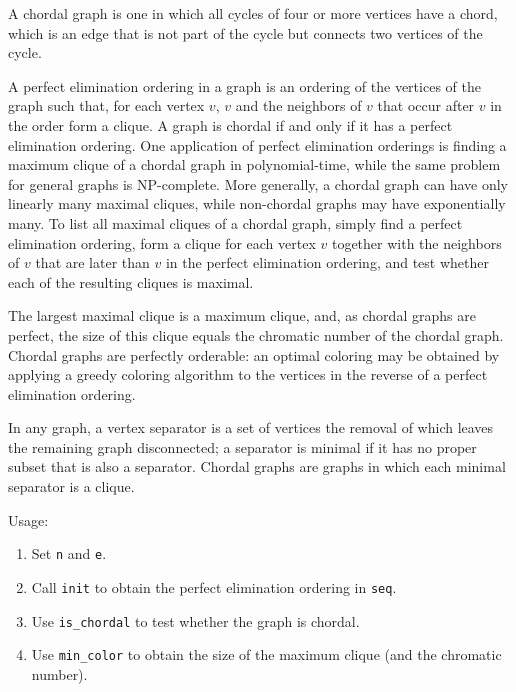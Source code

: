 A chordal graph is one in which all cycles of four or more vertices have a chord, which is an edge that is not part of the cycle but connects two vertices of the cycle.

A perfect elimination ordering in a graph is an ordering of the vertices of the graph such that, for each vertex $v$, $v$ and the neighbors of $v$ that occur after $v$ in the order form a clique. A graph is chordal if and only if it has a perfect elimination ordering. One application of perfect elimination orderings is finding a maximum clique of a chordal graph in polynomial-time, while the same problem for general graphs is NP-complete. More generally, a chordal graph can have only linearly many maximal cliques, while non-chordal graphs may have exponentially many. To list all maximal cliques of a chordal graph, simply find a perfect elimination ordering, form a clique for each vertex $v$ together with the neighbors of $v$ that are later than $v$ in the perfect elimination ordering, and test whether each of the resulting cliques is maximal.

The largest maximal clique is a maximum clique, and, as chordal graphs are perfect, the size of this clique equals the chromatic number of the chordal graph. Chordal graphs are perfectly orderable: an optimal coloring may be obtained by applying a greedy coloring algorithm to the vertices in the reverse of a perfect elimination ordering.

In any graph, a vertex separator is a set of vertices the removal of which leaves the remaining graph disconnected; a separator is minimal if it has no proper subset that is also a separator. Chordal graphs are graphs in which each minimal separator is a clique.

Usage:
\begin{enumerate}
  \item Set \texttt{n} and \texttt{e}.
  \item Call \texttt{init} to obtain the perfect elimination ordering in \texttt{seq}.
  \item Use \texttt{is\_chordal} to test whether the graph is chordal.
  \item Use \texttt{min\_color} to obtain the size of the maximum clique (and the chromatic number).
\end{enumerate}



